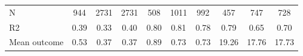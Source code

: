 \begin{tabular}{lccc|ccc|ccc}
N           &         944         &        2731         &        2731         &         508         &        1011         &         992         &         457         &         747         &         728         \\
R2          &        0.39         &        0.33         &        0.40         &        0.80         &        0.81         &        0.78         &        0.79         &        0.65         &        0.70         \\
Mean outcome&        0.53         &        0.37         &        0.37         &        0.89         &        0.73         &        0.73         &       19.26         &       17.76         &       17.73         \\
\bottomrule \end{tabular}
